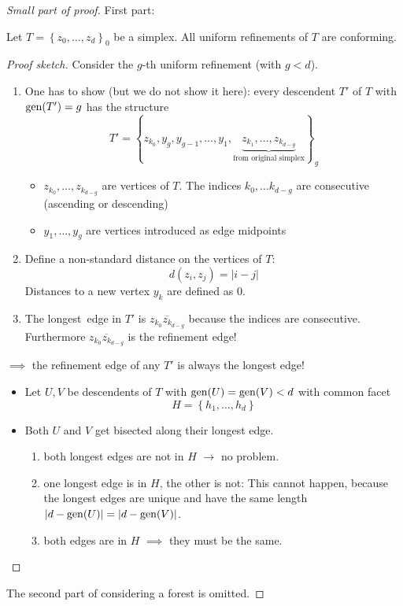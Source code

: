 \begin{proof}[Small part of proof]
	First part:
	\begin{lemma}
		Let $T = \left\{ z_{0},\dots ,z_{d} \right\}_{0}$ be a simplex. All uniform refinements of $T$ are conforming.
	\end{lemma}
  \begin{proof}[Proof sketch]
    Consider the $g$-th uniform refinement (with $g < d$).
		\begin{enumerate}
      \item One has to show (but we do not show it here): every descendent $T'$ of $T$ with $\operatorname{gen}(T')=g$ has the structure
				\begin{equation*}
					T' = \left\{ z_{k_{0}},y_{g},y_{g-1},\dots ,y_{1},\underbrace{z_{k_{1}},\dots, z_{k_{d-g}} }_{\text{from original simplex}} \right\}_{g}
				\end{equation*}
				\begin{itemize}
					\item $z_{k_{0}}, \dots ,z_{k_{d-g}}$ are vertices of $T$. The indices $k_{0},\dots k_{d-g}$ are consecutive (ascending or descending)
					\item $y_{1},\dots ,y_{g}$ are vertices introduced as edge midpoints
				\end{itemize}
			\item Define a non-standard distance on the vertices of $T$:
				\begin{equation*}
					d(z_{i},z_{j}) = |i-j|
				\end{equation*}
				Distances to a new vertex $y_{k}$ are defined as $0$.
			\item The \glqq longest\grqq\ edge in $T'$ is $\overline{z_{k_{0}}z_{k_{d-g}}}$ because the indices are consecutive.
				Furthermore $\overline{z_{k_{0}}z_{k_{d-g}}}$ is the refinement edge!
		\end{enumerate}
    $\implies$ the refinement edge of any $T'$ is always the \glqq longest\grqq{} edge!
		\begin{itemize}
			\item Let $U,V$ be descendents of $T$ with $\operatorname{gen}(U)=\operatorname{gen}(V)< d$ with common facet 
				\begin{equation*}
					H = \left\{ h_{1},\dots ,h_{d} \right\}	
				\end{equation*}
				 
			\item Both $U$ and $V$ get bisected along their longest edge.
				\begin{enumerate}[label = Case \arabic*]
					\item both longest edges are not in $H$ $\to$ no problem.
					\item one longest edge is in $H$, the other is not:
						This cannot happen, because the longest edges are unique and have the same length $|d- \operatorname{gen}(U)|=|d-\operatorname{gen}(V)|$.
					\item both edges are in $H$ $\implies$ they must be the same. \qedhere
				\end{enumerate}
		\end{itemize} 
  \end{proof}
  The second part of considering a forest is omitted.
\end{proof}

